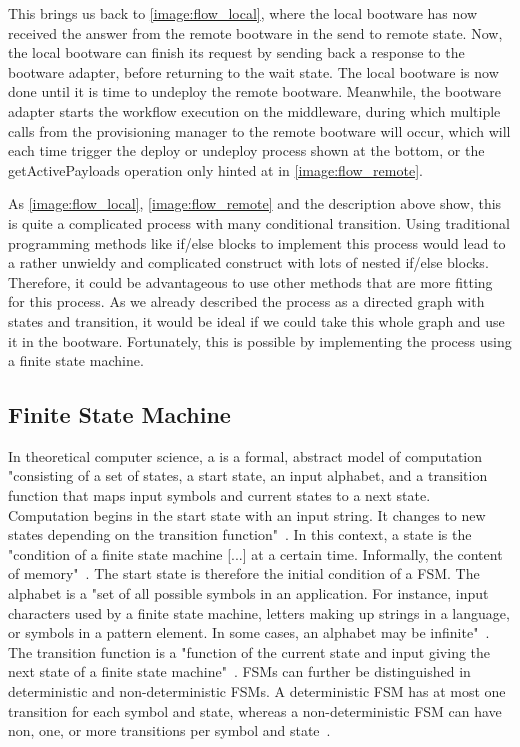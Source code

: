 This brings us back to \autoref{image:flow_local}, where the local bootware has now received the answer from the remote bootware in the send to remote state.
Now, the local bootware can finish its request by sending back a response to the bootware adapter, before returning to the wait state.
The local bootware is now done until it is time to undeploy the remote bootware.
Meanwhile, the bootware adapter starts the workflow execution on the middleware, during which multiple calls from the provisioning manager to the remote bootware will occur, which will each time trigger the deploy or undeploy process shown at the bottom, or the getActivePayloads operation only hinted at in \autoref{image:flow_remote}.

As \autoref{image:flow_local}, \autoref{image:flow_remote} and the description above show, this is quite a complicated process with many conditional transition.
Using traditional programming methods like if/else blocks to implement this process would lead to a rather unwieldy and complicated construct with lots of nested if/else blocks.
Therefore, it could be advantageous to use other methods that are more fitting for this process.
As we already described the process as a directed graph with states and transition, it would be ideal if we could take this whole graph and use it in the bootware.
Fortunately, this is possible by implementing the process using a finite state machine.

\subsection{Finite State Machine}

In theoretical computer science, a  is a formal, abstract model of computation "consisting of a set of states, a start state, an input alphabet, and a transition function that maps input symbols and current states to a next state. Computation begins in the start state with an input string. It changes to new states depending on the transition function"~\autocite{fsm}.
In this context, a state is the "condition of a finite state machine [...] at a certain time. Informally, the content of memory"~\autocite{state}.
The start state is therefore the initial condition of a FSM.
The alphabet is a "set of all possible symbols in an application. For instance, input characters used by a finite state machine, letters making up strings in a language, or symbols in a pattern element. In some cases, an alphabet may be infinite"~\autocite{alphabet}.
The transition function is a "function of the current state and input giving the next state of a finite state machine"~\autocite{transitionfn}.
FSMs can further be distinguished in deterministic and non-deterministic FSMs.
A deterministic FSM has at most one transition for each symbol and state, whereas a non-deterministic FSM can have non, one, or more transitions per symbol and state~\autocite{deterministic}.

